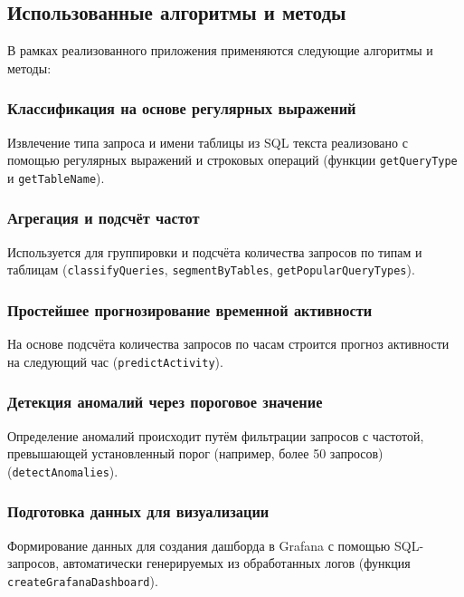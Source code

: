 \documentclass[14pt]{extarticle}
\begin{document}
\subsection{Использованные алгоритмы и методы}

В рамках реализованного приложения применяются следующие алгоритмы и методы:

\subsubsection*{Классификация на основе регулярных выражений}

Извлечение типа запроса и имени таблицы из SQL текста реализовано с помощью регулярных выражений и строковых операций (функции \texttt{getQueryType} и \texttt{getTableName}).

\subsubsection*{Агрегация и подсчёт частот}

Используется для группировки и подсчёта количества запросов по типам и таблицам (\texttt{classifyQueries}, \texttt{segmentByTables}, \texttt{getPopularQueryTypes}).

\subsubsection*{Простейшее прогнозирование временной активности}

На основе подсчёта количества запросов по часам строится прогноз активности на следующий час (\texttt{predictActivity}).

\subsubsection*{Детекция аномалий через пороговое значение}

Определение аномалий происходит путём фильтрации запросов с частотой, превышающей установленный порог (например, более 50 запросов) (\texttt{detectAnomalies}).

\subsubsection*{Подготовка данных для визуализации}

Формирование данных для создания дашборда в Grafana с помощью SQL-запросов, автоматически генерируемых из обработанных логов (функция \texttt{createGrafanaDashboard}).
\end{document}
